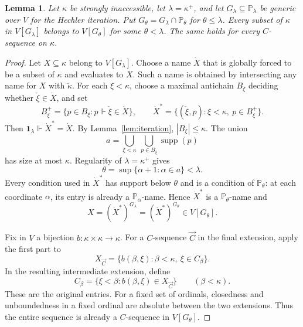 \documentclass[11pt,a4paper]{amsart}
\newtheorem{lemma}[theorem]{Lemma}
\theoremstyle{definition}
\theoremstyle{remark}
\newcommand{\PP}{\mathbb P}
\DeclareMathOperator{\supp}{supp}
\begin{document}
\begin{lemma}\label{lem:localization}
Let \(\kappa\) be strongly inaccessible, let \(\lambda=\kappa^+\),
and let \(G_\lambda\subseteq\PP_\lambda\) be generic over
\(V\) for the Hechler iteration. Put
\(G_\theta=G_\lambda\cap\PP_\theta\) for
\(\theta\leq\lambda\). Every subset of \(\kappa\) in
\(V[G_\lambda]\) belongs to \(V[G_\theta]\) for some
\(\theta<\lambda\). The same holds for every \(C\)-sequence
on \(\kappa\).
\end{lemma}
\begin{proof}
Let \(X\subseteq\kappa\) belong to \(V[G_\lambda]\).
Choose a name \(\dot X\) that is globally forced to
be a subset of \(\kappa\) and evaluates to \(X\).
Such a name is obtained by intersecting any name for
\(X\) with \(\check\kappa\). For each \(\xi<\kappa\),
choose a maximal antichain \(B_\xi\) deciding whether
\(\check\xi\in\dot X\), and set
\[
 B_\xi^+=\{p\in B_\xi:p\Vdash\check\xi\in\dot X\},
 \qquad
 \dot X^*=\{(\check\xi,p):\xi<\kappa,\ p\in B_\xi^+\}.
\]
Then \(\mathbf1_\lambda\Vdash\dot X^*=\dot X\).
By Lemma~\ref{lem:iteration}, \(|B_\xi|\leq\kappa\).
The union
\[
 a=\bigcup_{\xi<\kappa}\ \bigcup_{p\in B_\xi}\supp(p)
\]
has size at most \(\kappa\). Regularity of
\(\lambda=\kappa^+\) gives
\[
 \theta=\sup\{\alpha+1:\alpha\in a\}<\lambda.
\]
Every condition used in \(\dot X^*\) has support
below \(\theta\) and is a condition of \(\PP_\theta\):
at each coordinate \(\alpha\), its entry is already
a \(\PP_\alpha\)-name. Hence \(\dot X^*\) is a
\(\PP_\theta\)-name and
\[
 X=(\dot X^*)^{G_\lambda}
        =(\dot X^*)^{G_\theta}\in V[G_\theta].
\]

Fix in \(V\) a bijection \(b:\kappa\times\kappa\to\kappa\).
For a \(C\)-sequence \(\vec C\) in the final
extension, apply the first part to
\[
 X_{\vec C}=\{b(\beta,\xi):\beta<\kappa,\ \xi\in C_\beta\}.
\]
In the resulting intermediate extension, define
\[
 C_\beta=\{\xi<\beta:b(\beta,\xi)\in X_{\vec C}\}
                                             \qquad(\beta<\kappa).
\]
These are the original entries. For a fixed set of
ordinals, closedness and unboundedness in a fixed ordinal
are absolute between the two extensions. Thus the entire
sequence is already a \(C\)-sequence in \(V[G_\theta]\).
\end{proof}
\end{document}

